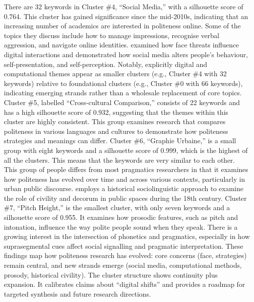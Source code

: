 \documentclass[english]{textolivre}
\begin{document}
There are 32 keywords in Cluster \#4, ``Social Media,'' with a silhouette score of 0.764. This cluster has gained significance since the mid-2010s, indicating that an increasing number of academics are interested in politeness online. Some of the topics they discuss include how to manage impressions, recognise verbal aggression, and navigate online identities. \textcite{chen2015} examined how face threats influence digital interactions and demonstrated how social media alters people’s behaviour, self-presentation, and self-perception. Notably, explicitly digital and computational themes appear as smaller clusters (e.g., Cluster \#4 with 32 keywords) relative to foundational clusters (e.g., Cluster \#0 with 66 keywords), indicating emerging strands rather than a wholesale replacement of core topics. Cluster \#5, labelled ``Cross-cultural Comparison,'' consists of 22 keywords and has a high silhouette score of 0.932, suggesting that the themes within this cluster are highly consistent. This group examines research that compares politeness in various languages and cultures to demonstrate how politeness strategies and meanings can differ. Cluster \#6, ``Graphie Urbaine,'' is a small group with eight keywords and a silhouette score of 0.999, which is the highest of all the clusters. This means that the keywords are very similar to each other. This group of people differs from most pragmatics researchers in that it examines how politeness has evolved over time and across various contexts, particularly in urban public discourse. \textcite{peltonen2005} employs a historical sociolinguistic approach to examine the role of civility and decorum in public spaces during the 18th century. Cluster \#7, ``Pitch Height,'' is the smallest cluster, with only seven keywords and a silhouette score of 0.955. It examines how prosodic features, such as pitch and intonation, influence the way polite people sound when they speak. There is a growing interest in the intersection of phonetics and pragmatics, especially in how suprasegmental cues affect social signalling and pragmatic interpretation. These findings map how politeness research has evolved: core concerns (face, strategies) remain central, and new strands emerge (social media, computational methods, prosody, historical civility). The cluster structure shows continuity plus expansion. It calibrates claims about ``digital shifts'' and provides a roadmap for targeted synthesis and future research directions.
\end{document}
